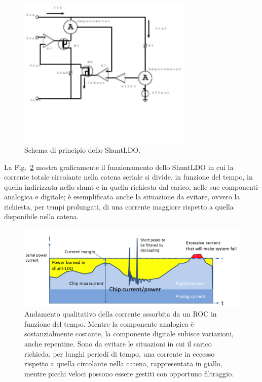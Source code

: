 \begin{figure}[!htbp]
\centering
\includegraphics[width=0.75\textwidth]{Immagini/SLDObase}
\caption{Schema di principio dello ShuntLDO.}
\label{SLDOprova}
\end{figure}
 
La Fig.~\ref{SLDOprinciple} mostra graficamente il funzionamento dello ShuntLDO in cui la corrente totale circolante nella catena seriale si divide, in funzione del tempo, in quella indirizzata nello shunt e in quella richiesta dal carico, nelle sue componenti analogica e digitale; \`e esemplificata anche la situazione da evitare, ovvero la richiesta, per tempi prolungati, di una corrente maggiore rispetto a quella disponibile nella catena.
\begin{figure}[!htbp]
\centering
\includegraphics[scale=.5]{Immagini/ShuntRegulatorPrinciple}
\caption{Andamento qualitativo della corrente assorbita da un ROC in funzione del tempo. Mentre la componente analogica \`e sostanzialmente costante, la componente digitale subisce variazioni, anche repentine. Sono da evitare le situazioni in cui il carico richieda, per lunghi periodi di tempo, una corrente in eccesso rispetto a quella circolante nella catena, rappresentata in giallo, mentre picchi veloci possono essere gestiti con opportuno filtraggio.}
\label{SLDOprinciple}
\end{figure}

